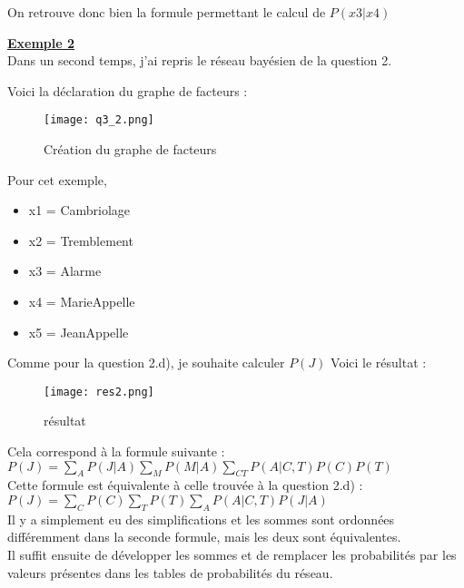 \documentclass[12pt]{article}
\begin{document}
On retrouve donc bien la formule permettant le calcul de $P(x3|x4)$

\textbf{\underline{Exemple 2}}
\\
Dans un second temps, j'ai repris le réseau bayésien de la question 2.

Voici la déclaration du graphe de facteurs :
\\
\begin{figure}[H]
\begin{center}
  \texttt{[image: q3\_2.png]}
  \caption{Création du graphe de facteurs}
  \label{fig:Exemple}
\end{center}
\end{figure}

Pour cet exemple, 
\begin{itemize}
\item x1 = Cambriolage
\item x2 = Tremblement
\item x3 = Alarme
\item x4 = MarieAppelle
\item x5 = JeanAppelle
\end{itemize}
Comme pour la question 2.d), je souhaite calculer $P(J)$
Voici le résultat : 
\begin{figure}[H]
\begin{center}
  \texttt{[image: res2.png]}
  \caption{résultat}
\end{center}
\end{figure}
Cela correspond à la formule suivante : \\ 
$P(J) = \sum_{A} P(J|A) \sum_{M} P(M|A) \sum_{C T} P(A|C, T) P(C) P(T) $ \\
Cette formule est équivalente à celle trouvée à la question 2.d) : \\
$P(J) = \sum_{C} P(C) \sum_{T} P(T) \sum_{A} P(A|C,T)P(J|A)$
\\ \linebreak
Il y a simplement eu des simplifications et les sommes sont ordonnées différemment dans la seconde formule, mais les deux sont équivalentes. \\
Il suffit ensuite de développer les sommes et de remplacer les probabilités par les valeurs présentes dans les tables de probabilités du réseau.
\end{document}
